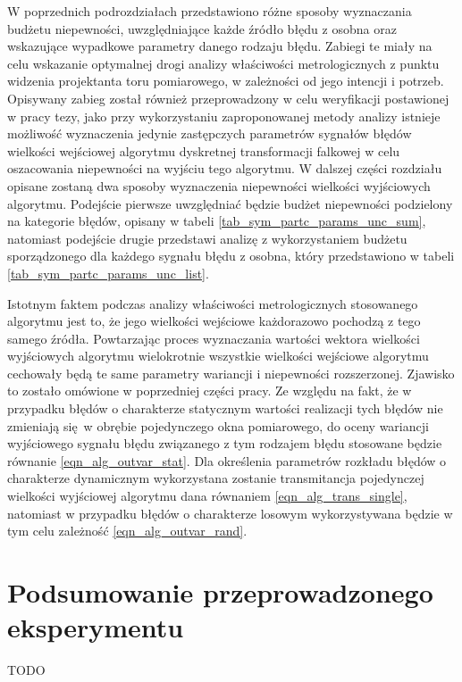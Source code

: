 W poprzednich podrozdziałach przedstawiono różne sposoby wyznaczania budżetu niepewności, uwzględniające każde źródło błędu z osobna oraz wskazujące wypadkowe parametry danego rodzaju błędu. Zabiegi te miały na celu wskazanie optymalnej drogi analizy właściwości metrologicznych z punktu widzenia projektanta toru pomiarowego, w zależności od jego intencji i potrzeb. Opisywany zabieg został również przeprowadzony w celu weryfikacji postawionej w pracy tezy, jako przy wykorzystaniu zaproponowanej metody analizy istnieje możliwość wyznaczenia jedynie zastępczych parametrów sygnałów błędów wielkości wejściowej algorytmu dyskretnej transformacji falkowej w celu oszacowania niepewności na wyjściu tego algorytmu. W dalszej części rozdziału opisane zostaną dwa sposoby wyznaczenia niepewności wielkości wyjściowych algorytmu. Podejście pierwsze uwzględniać będzie budżet niepewności podzielony na kategorie błędów, opisany w tabeli \ref{tab_sym_partc_params_unc_sum}, natomiast podejście drugie przedstawi analizę z wykorzystaniem budżetu sporządzonego dla każdego sygnału błędu z osobna, który przedstawiono w tabeli \ref{tab_sym_partc_params_unc_list}.

Istotnym faktem podczas analizy właściwości metrologicznych stosowanego algorytmu jest to, że jego wielkości wejściowe każdorazowo pochodzą z tego samego źródła. Powtarzając proces wyznaczania wartości wektora wielkości wyjściowych algorytmu wielokrotnie wszystkie wielkości wejściowe algorytmu cechowały będą te same parametry wariancji i niepewności rozszerzonej. Zjawisko to zostało omówione w poprzedniej części pracy. Ze względu na fakt, że w przypadku błędów o charakterze statycznym wartości realizacji tych błędów nie zmieniają się w obrębie pojedynczego okna pomiarowego, do oceny wariancji wyjściowego sygnału błędu związanego z tym rodzajem błędu stosowane będzie równanie \eqref{eqn_alg_outvar_stat}. Dla określenia parametrów rozkładu błędów o charakterze dynamicznym wykorzystana zostanie transmitancja pojedynczej wielkości wyjściowej algorytmu dana równaniem \eqref{eqn_alg_trans_single}, natomiast w przypadku błędów o charakterze losowym wykorzystywana będzie w tym celu zależność \eqref{eqn_alg_outvar_rand}.

\section{Podsumowanie przeprowadzonego eksperymentu}

TODO

